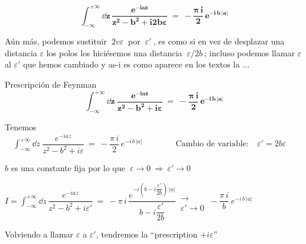  $$\displaystyle \boldsymbol{
 \int_{-\infty}^{+\infty}  \dd z \, \dfrac {e^{-iaz}}{z^2-b^2+i2b\varepsilon} \ = \  - \dfrac{\pi\, i}{2} \, e^{-i\, b\,|a|} 
 }$$
 
 Aún más, podemos sustituir $\ 2v\varepsilon \ $ por $\ \varepsilon' \ $, es como si en vez de desplazar una distancia $\varepsilon$ los polos los hiciésemos una distancia $\ \varepsilon/2b\ $; incluso podemos llamar $\varepsilon$ al $\varepsilon'$ que hemos cambiado y as-i es como aparece en los textos la ...
 
 \vspace{5mm}
 \begin{large}
 \begin{myblock}{Prescripción de Feynman }
 \begin{equation}
 \label{T43PF}
 \boldsymbol{
 \int_{-\infty}^{+\infty}  \dd z \ \dfrac {e^{-iaz}}{z^2-b^2+i\varepsilon} \ = \  - \dfrac{\pi\, i}{2} \, e^{-i\, b\,|a|} 
 }	
 \end{equation}	
 \end{myblock}
 \end{large}

\vspace{10mm}
\color{gris}

Tenemos $\quad \displaystyle  \int_{-\infty}^{+\infty}  \dd z \ \dfrac {e^{-iaz}}{z^2-b^2+i\varepsilon} \ = \  - \dfrac{\pi\, i}{2} \, e^{-i\, b\,|a|}  \qquad \qquad  \text{Cambio de variable:}\quad \varepsilon'=2b\varepsilon$

$b$ es una constante fija por lo que $\ \varepsilon\to 0 \ \Rightarrow \  \varepsilon' \to 0$

$I= \int_{-\infty}^{+\infty}  \dd z \, \dfrac {e^{-iaz}}{z^2-b^2+i\varepsilon'} \ = \  - \pi \, i \,  \dfrac { e^{ -i \left( b-i\dfrac{\varepsilon'}{2b} \right)\, |a| } } {b-i \dfrac{\varepsilon'}{2b}} \, 
\begin{matrix} \\ \longrightarrow \\ \varepsilon'\to 0 \end{matrix}
\, -\dfrac{\pi\, i}{b}\ e^{-i\, b\, |a|}$

Volviendo a llamar $\varepsilon$ a $\varepsilon'$, tendremos la ``prescription $+i\varepsilon$''


\color{black} 
